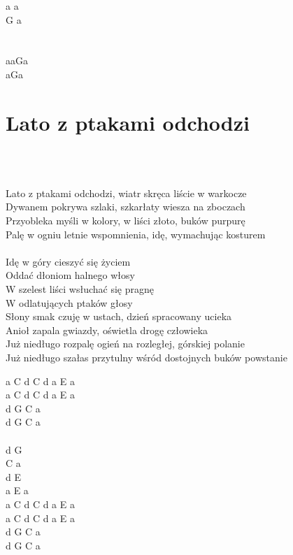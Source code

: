 \documentclass[a5paper, 10pt]{book}
\begin{document}
\begin{minipage}[t]{0.1\textwidth}
a a\\
G a\\
~\\
~\\

aaGa \\ aGa\\

\end{minipage}

\newpage
\section{Lato z ptakami odchodzi}\textcolor{lightgray}{\textit{}}\\~\\
\begin{minipage}[t]{0.8\textwidth}
Lato z ptakami odchodzi, wiatr skręca liście w warkocze\\
Dywanem pokrywa szlaki, szkarłaty wiesza na zboczach\\
Przyobleka myśli w kolory, w liści złoto, buków purpurę\\
Palę w ogniu letnie wspomnienia, idę, wymachując kosturem\\
\\
\hspace*{5mm}Idę w góry cieszyć się życiem\\
\hspace*{5mm}Oddać dłoniom halnego włosy\\
\hspace*{5mm}W szelest liści wsłuchać się pragnę\\
\hspace*{5mm}W odlatujących ptaków głosy\\

Słony smak czuję w ustach, dzień spracowany ucieka\\
Anioł zapala gwiazdy, oświetla drogę człowieka\\
Już niedługo rozpalę ogień na rozległej, górskiej polanie\\
Już niedługo szałas przytulny wśród dostojnych buków powstanie\\

\end{minipage}
\begin{minipage}[t]{0.2\textwidth}
a C d C d a E a\\
a C d C d a E a\\
 d G C a \\ 
 d G C a \\ 
\\
 d G\\
 C a\\
 d E\\
a E a\\

a C d C d a E a\\
a C d C d a E a\\
 d G C a \\ 
 d G C a \\
\end{minipage}
\end{document}

